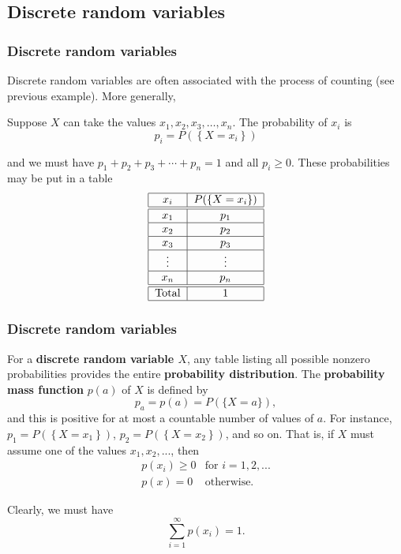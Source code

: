 \documentclass[notes=show,smaller,handout]{beamer}\usepackage[]{graphicx}\usepackage[]{color}
\newcommand{\bea}{\begin{eqnarray}}
\newcommand{\eea}{\end{eqnarray}}
\newcommand{\nn}{\nonumber}
\begin{document}
\subsection{Discrete random variables}

\begin{frame}%

\frametitle{Discrete random variables}

Discrete random variables are often associated with the process of counting (see previous
example). More generally,
\begin{definition}
Suppose $X$ can take the values $x_{1},x_{2},x_{3},\ldots ,x_{n}$. The probability of $x_{i}$ is
$$p_{i}= P(\left\{ X=x_i\right\})$$

and we must have $p_{1}+p_{2}+p_{3}+\cdots +p_{n}=1$ and all $p_{i}\geq 0$. These probabilities may be put in a table%
\begin{equation*}
\begin{tabular}{|c|c|}
\hline
$x_i $ & $P(\left\{ X=x_i\right\}) $ \\ \hline\hline
$x_{1}$ & $p_{1}$ \\ \hline
$x_{2}$ & $p_{2}$ \\ \hline
$x_{3}$ & $p_{3}$ \\ \hline
$\vdots $ & $\vdots $ \\ \hline
$x_{n}$ & $p_{n}$ \\ \hline\hline
Total & $1$ \\ \hline
\end{tabular}%
\end{equation*}
\end{definition}
\end{frame}%

\begin{frame}%

\frametitle{Discrete random variables}


For a \textbf{discrete random variable $X$}, any table listing all
possible nonzero probabilities provides the entire \textbf{probability
distribution}. The \textbf{probability mass function} $p(a)$ of $X$ is defined by
$$ p_a = p(a)= P(\{X=a \}),
$$
and this is positive for at most a countable number of values of $a$. For instance,
$p_{1} = P(\left\{ X=x_1\right\})$, $p_{2} = P(\left\{ X=x_2\right\})$, and so on.
That is, if $X$ must assume
one of the values $x_1,x_2,...$, then
\bea
 p(x_i) \geq 0 & \text{for \ \ } i=1,2,... \nn \\
 p(x) = 0 & \text{otherwise.}
\eea

Clearly, we must have
$$
\sum_{i=1}^{\infty} p(x_i) = 1.
$$



\end{frame}%
\end{document}
